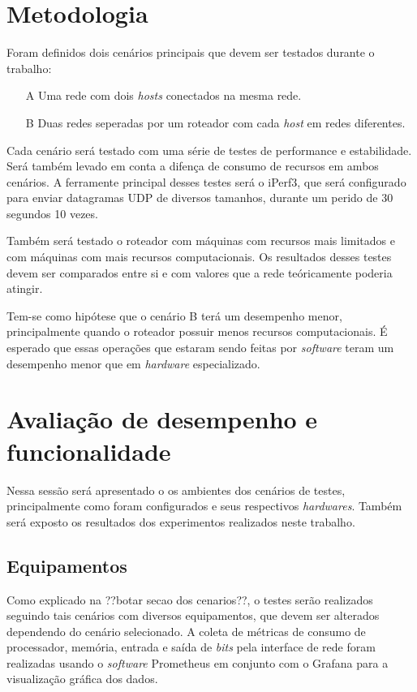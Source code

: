 \documentclass[12pt]{article}
\begin{document}
\section{Metodologia}
Foram definidos dois cenários principais que devem ser testados durante o trabalho:
\begin{enumerate}
	\item[A] Uma rede com dois \textit{hosts} conectados na mesma rede.
	\item[B] Duas redes seperadas por um roteador com cada \textit{host} em redes diferentes. 
\end{enumerate}

Cada cenário será testado com uma série de testes de performance e estabilidade. Será também levado em conta a difença de consumo de recursos em ambos cenários. A ferramente principal desses testes será o iPerf3, que será configurado para enviar datagramas UDP de diversos tamanhos, durante um perido de 30 segundos 10 vezes.

Também será testado o roteador com máquinas com recursos mais limitados e com máquinas com mais recursos computacionais. Os resultados desses testes devem ser comparados entre si e com valores que a rede teóricamente poderia atingir.

Tem-se como hipótese que o cenário B terá um desempenho menor, principalmente quando o roteador possuir menos recursos computacionais. É esperado que essas operações que estaram sendo feitas por \textit{software} teram um desempenho menor que em \textit{hardware} especializado.


\section{Avaliação de desempenho e funcionalidade}
Nessa sessão será apresentado o os ambientes dos cenários de testes, principalmente como foram configurados e seus respectivos \textit{hardwares}. Também será exposto os resultados dos experimentos realizados neste trabalho.
\subsection{Equipamentos}
Como explicado na ??botar secao dos cenarios??, o testes serão realizados seguindo tais cenários com diversos equipamentos, que devem ser alterados dependendo do cenário selecionado.
A coleta de métricas de consumo de processador, memória, entrada e saída de \textit{bits} pela interface de rede
foram realizadas usando o \textit{software} Prometheus em conjunto com o Grafana para a visualização gráfica dos dados.
\end{document}
